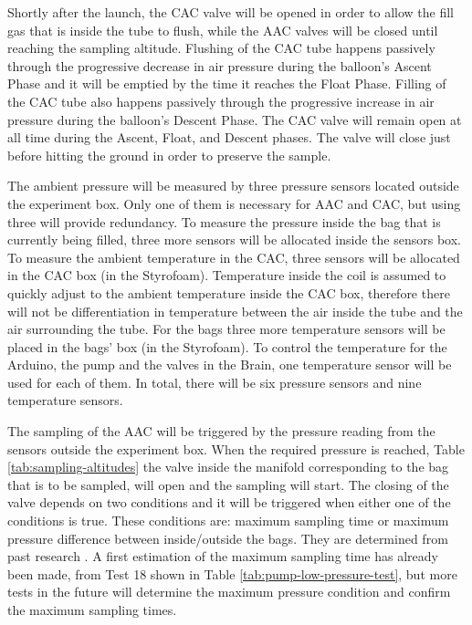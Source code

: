 Shortly after the launch, the CAC valve will be opened in order to allow the fill gas that is inside the tube to flush, while the AAC valves will be closed until reaching the sampling altitude. Flushing of the CAC tube happens passively through the progressive decrease in air pressure during the balloon's Ascent Phase and it will be emptied by the time it reaches the Float Phase. Filling of the CAC tube also happens passively through the progressive increase in air pressure during the balloon's Descent Phase. The CAC valve will remain open at all time during the Ascent, Float, and Descent phases. The valve will close just before hitting the ground in order to preserve the sample. 

The ambient pressure will be measured by three pressure sensors located outside the experiment box. Only one of them is necessary for AAC and CAC, but using three will provide redundancy. To measure the pressure inside the bag that is currently being filled, three more sensors will be allocated inside the sensors box. To measure the ambient temperature in the CAC, three sensors will be allocated in the CAC box (in the Styrofoam). Temperature inside the coil is assumed to quickly adjust to the ambient temperature inside the CAC box, therefore there will not be differentiation in temperature between the air inside the tube and the air surrounding the tube. For the bags three more temperature sensors will be placed in the bags' box (in the Styrofoam). To control the temperature for the Arduino, the pump and the valves in the Brain, one temperature sensor will be used for each of them. In total, there will be six pressure sensors and nine temperature sensors. 

The sampling of the AAC will be triggered by the pressure reading from the sensors outside the experiment box. When the required pressure is reached, Table \ref{tab:sampling-altitudes} the valve inside the manifold corresponding to the bag that is to be sampled, will open and the sampling will start. The closing of the valve depends on two conditions and it will be triggered when either one of the conditions is true. These conditions are: maximum sampling time or maximum pressure difference between inside/outside the bags. They are determined from past research \cite{LISA}. A first estimation of the maximum sampling time has already been made, from Test 18 shown in Table \ref{tab:pump-low-pressure-test}, but more tests in the future will determine the maximum pressure condition and confirm the maximum sampling times.


